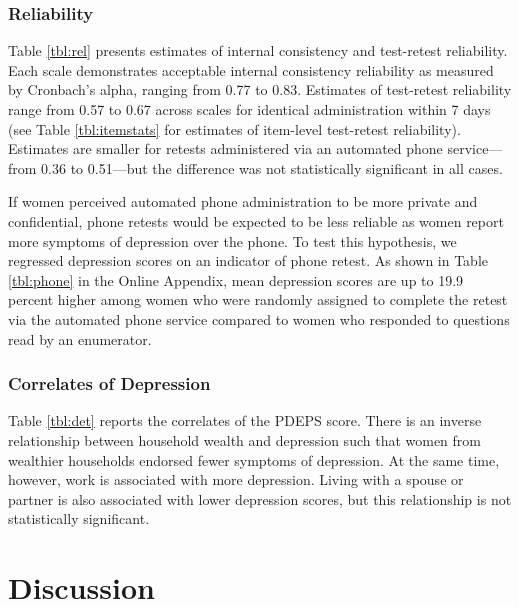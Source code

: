 \documentclass[man,natbib,longtable]{apa6}\usepackage[]{graphicx}\usepackage[]{color}
\begin{document}


\subsubsection{Reliability}

Table \ref{tbl:rel} presents estimates of internal consistency and test-retest reliability. Each scale demonstrates acceptable internal consistency reliability as measured by Cronbach's alpha, ranging from 0.77 to 0.83. Estimates of test-retest reliability range from 0.57 to 0.67 across scales for identical administration within 7 days (see Table \ref{tbl:itemstats} for estimates of item-level test-retest reliability). Estimates are smaller for retests administered via an automated phone service---from 0.36 to 0.51---but the difference was not statistically significant in all cases.

If women perceived automated phone administration to be more private and confidential, phone retests would be expected to be less reliable as women report more symptoms of depression over the phone. To test this hypothesis, we regressed depression scores on an indicator of phone retest. As shown in Table \ref{tbl:phone} in the Online Appendix, mean depression scores are up to 19.9 percent higher among women who were randomly assigned to complete the retest via the automated phone service compared to women who responded to questions read by an enumerator.



\subsubsection{Correlates of Depression}

Table \ref{tbl:det} reports the correlates of the PDEPS score. There is an inverse relationship between household wealth and depression such that women from wealthier households endorsed fewer symptoms of depression. At the same time, however, work is associated with more depression. Living with a spouse or partner is also associated with lower depression scores, but this relationship is not statistically significant.  



\section{Discussion}
\end{document}
